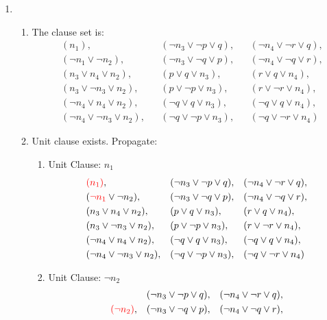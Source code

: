 \documentclass[11pt,a4paper]{article}
\begin{document}
\begin{enumerate}

\item 
\begin{enumerate}
\item The clause set is:
\begin{align*}
&(n_1),& & (\neg n_3 \lor \neg p \lor q), & & (\neg n_4 \lor \neg r \lor q),\\ 
&(\neg n_1 \lor \neg n_2),& & (\neg n_3 \lor \neg q \lor p),  && (\neg n_4 \lor \neg q \lor r), \\
&(n_3 \lor n_4 \lor n_2),& & (p\lor q \lor n_3),  && (r \lor q \lor n_4), \\
&(n_3 \lor \neg  n_3 \lor n_2) ,  & & (p \lor \neg p \lor n_3), & & (r \lor \neg r \lor n_4), \\
&(\neg n_4 \lor  n_4 \lor n_2) , & & (\neg q \lor q \lor n_3),& & (\neg q \lor q \lor n_4), \\
&(\neg n_4 \lor  \neg  n_3 \lor n_2), && (\neg q \lor \neg p \lor n_3), & & (\neg q \lor \neg r \lor n_4)
\end{align*}
\item Unit clause exists. Propagate:
\begin{enumerate}
\item Unit Clause:  $n_1$
\begin{align*}
&\textcolor{red}{(n_1)},& & (\neg n_3 \lor \neg p \lor q), & & (\neg n_4 \lor \neg r \lor q),\\ 
&(\textcolor{red}{\neg n_1} \lor \neg n_2),& & (\neg n_3 \lor \neg q \lor p),  && (\neg n_4 \lor \neg q \lor r), \\
&(n_3 \lor n_4 \lor n_2),& & (p\lor q \lor n_3),  && (r \lor q \lor n_4), \\
&(n_3 \lor \neg  n_3 \lor n_2) ,  & & (p \lor \neg p \lor n_3), & & (r \lor \neg r \lor n_4), \\
&(\neg n_4 \lor  n_4 \lor n_2) , & & (\neg q \lor q \lor n_3),& & (\neg q \lor q \lor n_4), \\
&(\neg n_4 \lor  \neg  n_3 \lor n_2), && (\neg q \lor \neg p \lor n_3), & & (\neg q \lor \neg r \lor n_4)
\end{align*}
\item Unit Clause:  $\neg n_2$
\begin{align*}
& & & (\neg n_3 \lor \neg p \lor q), & & (\neg n_4 \lor \neg r \lor q),\\ 
&\textcolor{red}{(\neg n_2)},& & (\neg n_3 \lor \neg q \lor p),  && (\neg n_4 \lor \neg q \lor r), \\

\end{align*}
\end{enumerate}
\end{enumerate}
\end{enumerate}
\end{document}
